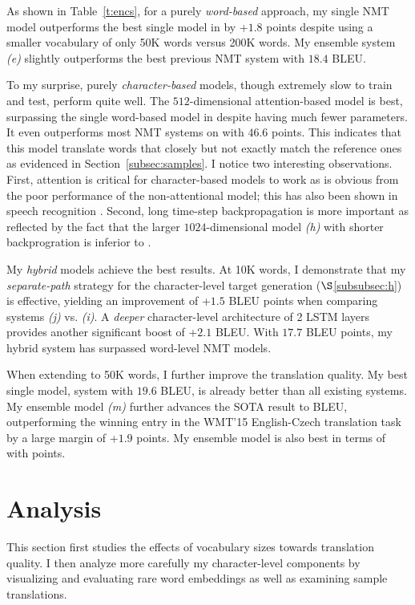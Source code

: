 As shown in Table~\ref{t:encs}, for a purely {\it word-based} approach, 
my single NMT model outperforms the best single model in \cite{jean15wmt} by
+$1.8$ points despite
using a smaller vocabulary of only 50K words versus 200K words. 
My ensemble system {\it (e)} slightly outperforms the best previous NMT system with $18.4$ BLEU.

To my surprise, purely {\it character-based} models, though extremely slow to
train and test, perform quite well. The $512$-dimensional attention-based model \modelchar{} is
best, surpassing the single word-based model in
\cite{jean15wmt} despite having much fewer parameters. It even outperforms most NMT
systems  
on \chr{} with $46.6$ points. This indicates that this model translate words that closely but
not exactly match the reference ones as evidenced in
Section~\ref{subsec:samples}. 
I notice two interesting observations. First,
attention is critical for character-based models to work as is obvious from the
poor performance of the non-attentional model; this has also been shown in speech
recognition \cite{chan16}. Second, long time-step backpropagation is more important
as reflected by the fact that the larger $1024$-dimensional model {\it (h)} with shorter
backprogration is inferior to \modelchar{}. 

My {\it hybrid} models achieve the best results. 
At 10K words, I demonstrate that my {\it
separate-path} strategy for the character-level target generation
($\S$\ref{subsubsec:h}) is effective, yielding an improvement of +$1.5$ BLEU
points when comparing systems {\it (j)} vs. {\it (i)}. A {\it deeper} character-level architecture of 2 LSTM
layers provides another significant
boost of +$2.1$ BLEU.
With $17.7$ BLEU points, my hybrid system \modelsmall{} has
surpassed word-level NMT models.

When extending to 50K words, I further improve the translation quality.
My best single model, system \model{} with $19.6$ BLEU, is already better than all
existing systems.
My ensemble model {\it (m)} further advances the SOTA
result to \biformat{\ensbleu} BLEU, outperforming
the winning entry in the WMT'15 English-Czech translation task by a large margin
of +$1.9$ points. My ensemble model is also best in terms of \chr{} with  points.

\section{Analysis}
\label{sec:analysis}
This section first studies the effects of vocabulary sizes towards
translation quality. I then analyze more carefully 
my character-level components by visualizing and evaluating rare word
embeddings as well as examining sample translations.

